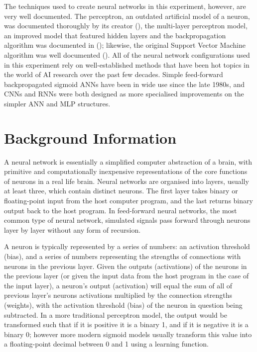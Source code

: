 \documentclass[]{report}
\begin{document}
The techniques used to create neural networks in this experiment, however, are very well documented. The perceptron, an outdated artificial model of a neuron, was documented thoroughly by its creator (\cite{rosenblatt1958perceptron}), the multi-layer perceptron model, an improved model that featured hidden layers and the backpropagation algorithm was documented in (\cite{rumelhart1986learning}); likewise, the original Support Vector Machine algorithm was well documented (\cite{vapnik1995support}). All of the neural network configurations used in this experiment rely on well-established methods that have been hot topics in the world of AI research over the past few decades. Simple feed-forward backpropagated sigmoid ANNs have been in wide use since the late 1980s, and CNNs and RNNs were both designed as more specialised improvements on the simpler ANN and MLP structures.

\section{Background Information}

A neural network is essentially a simplified computer abstraction of a brain, with primitive and computationally inexpensive representations of the core functions of neurons in a real life brain. Neural networks are organised into layers, usually at least three, which contain distinct neurons. The first layer takes binary or floating-point input from the host computer program, and the last returns binary output back to the host program. In feed-forward neural networks, the most common type of neural network, simulated signals pass forward through neurons layer by layer without any form of recursion.

A neuron is typically represented by a series of numbers: an activation threshold (bias), and a series of numbers representing the strengths of connections with neurons in the previous layer. Given the outputs (activations) of the neurons in the previous layer (or given the input data from the host program in the case of the input layer), a neuron's output (activation) will equal the sum of all of previous layer's neurons activations multiplied by the connection strengths (weights), with the activation threshold (bias) of the neuron in question being subtracted. In a more traditional perceptron model, the output would be transformed such that if it is positive it is a binary 1, and if it is negative it is a binary 0; however more modern sigmoid models usually transform this value into a floating-point decimal between 0 and 1 using a learning function.
\end{document}
